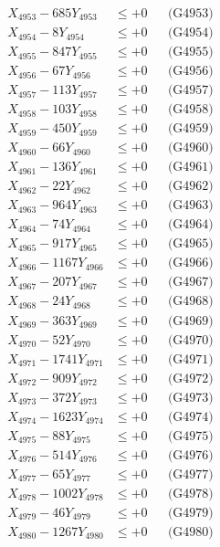 \documentclass[a4paper,10pt]{article}
\begin{document}
{\begin{align}
X_{4953} - 685Y_{4953} &\leq +0 && \text{(G4953)} \\
X_{4954} - 8Y_{4954} &\leq +0 && \text{(G4954)} \\
X_{4955} - 847Y_{4955} &\leq +0 && \text{(G4955)} \\
X_{4956} - 67Y_{4956} &\leq +0 && \text{(G4956)} \\
X_{4957} - 113Y_{4957} &\leq +0 && \text{(G4957)} \\
X_{4958} - 103Y_{4958} &\leq +0 && \text{(G4958)} \\
X_{4959} - 450Y_{4959} &\leq +0 && \text{(G4959)} \\
X_{4960} - 66Y_{4960} &\leq +0 && \text{(G4960)} \\
\allowbreak
X_{4961} - 136Y_{4961} &\leq +0 && \text{(G4961)} \\
X_{4962} - 22Y_{4962} &\leq +0 && \text{(G4962)} \\
X_{4963} - 964Y_{4963} &\leq +0 && \text{(G4963)} \\
X_{4964} - 74Y_{4964} &\leq +0 && \text{(G4964)} \\
X_{4965} - 917Y_{4965} &\leq +0 && \text{(G4965)} \\
X_{4966} - 1167Y_{4966} &\leq +0 && \text{(G4966)} \\
X_{4967} - 207Y_{4967} &\leq +0 && \text{(G4967)} \\
X_{4968} - 24Y_{4968} &\leq +0 && \text{(G4968)} \\
X_{4969} - 363Y_{4969} &\leq +0 && \text{(G4969)} \\
X_{4970} - 52Y_{4970} &\leq +0 && \text{(G4970)} \\
\allowbreak
X_{4971} - 1741Y_{4971} &\leq +0 && \text{(G4971)} \\
X_{4972} - 909Y_{4972} &\leq +0 && \text{(G4972)} \\
X_{4973} - 372Y_{4973} &\leq +0 && \text{(G4973)} \\
X_{4974} - 1623Y_{4974} &\leq +0 && \text{(G4974)} \\
X_{4975} - 88Y_{4975} &\leq +0 && \text{(G4975)} \\
X_{4976} - 514Y_{4976} &\leq +0 && \text{(G4976)} \\
X_{4977} - 65Y_{4977} &\leq +0 && \text{(G4977)} \\
X_{4978} - 1002Y_{4978} &\leq +0 && \text{(G4978)} \\
X_{4979} - 46Y_{4979} &\leq +0 && \text{(G4979)} \\
X_{4980} - 1267Y_{4980} &\leq +0 && \text{(G4980)} \\

\end{align}}
\end{document}
